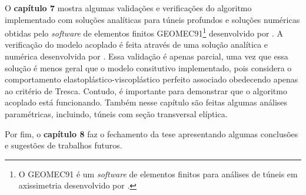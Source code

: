 O \textbf{capítulo 7} mostra algumas validações e verificações do algoritmo implementado com soluções analíticas para túneis profundos e soluções numéricas obtidas pelo \textit{software} de elementos finitos GEOMEC91\footnote{O GEOMEC91 é um \textit{software} de elementos finitos para análises de túneis em axissimetria desenvolvido por .} desenvolvido por . A verificação do modelo acoplado é feita através de uma solução analítica e numérica desenvolvida por . Essa validação é apenas parcial, uma vez que essa solução é menos geral que o modelo consitutivo implementado, pois considera o comportamento elastoplástico-viscoplástico perfeito associado obedecendo apenas ao critério de Tresca. Contudo, é importante para demonstrar que o algoritmo acoplado está funcionando. Também nesse capítulo são feitas algumas análises paramétricas, incluindo, túneis com seção transversal elíptica.

Por fim, o \textbf{capítulo 8} faz o fechamento da tese apresentando algumas conclusões e sugestões de trabalhos futuros.


 
